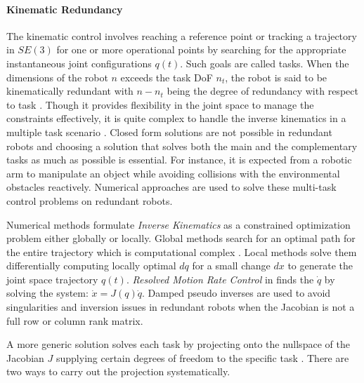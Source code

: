 \paragraph{Kinematic Redundancy}
The kinematic control involves reaching a reference point or tracking a trajectory in $SE(3)$ for one or more operational points by searching for the appropriate instantaneous joint configurations  $q(t)$. Such goals are called tasks. When the dimensions of the robot $n$ exceeds the task DoF $n_t$, the robot is said to be kinematically redundant with $n − n_t$ being the degree of redundancy with respect to task \cite{nakamura1990advanced}. Though it provides flexibility in the joint space to manage the constraints effectively, it is quite complex to handle the inverse kinematics in a multiple task scenario \cite{siciliano1991general}. Closed form solutions are not possible in redundant robots and choosing a solution that solves both the main and the complementary tasks as much as possible is essential. For instance, it is expected from a robotic arm to manipulate an object while avoiding collisions with the environmental obstacles reactively. Numerical approaches are used to solve these multi-task control problems on redundant robots.

Numerical methods formulate \textit{Inverse Kinematics} as a constrained optimization problem either globally or locally. Global methods search for an optimal path for the entire trajectory which is computational complex \cite{baillieul1990resolution}. Local methods solve them differentially computing locally optimal $dq$ for a small change $dx$ to generate the joint space trajectory $q(t)$. \textit{Resolved Motion Rate Control} in \cite{Whitney1969} finds the $\dot{q}$ by solving the system: $\dot{x} = J(q) \dot{q}$. Damped pseudo inverses \cite{nakamura1986inverse} are used to avoid singularities and inversion issues in redundant robots when the Jacobian is not a full row or column rank matrix. 

 A more generic solution solves each task by projecting onto the nullspace of the Jacobian $J$ supplying certain degrees of freedom to the specific task \cite{Liegeois1977}. There are two ways to carry out the projection systematically.

